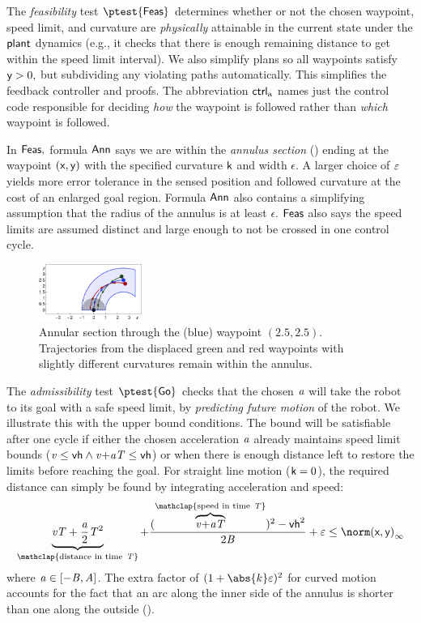 \documentclass[12pt]{cmuthesis}
\theoremstyle{definition}
\theoremstyle{remark}
\newcommand{\rref}[2][]{\prettyref{#2}}
\begin{document}
The \emph{feasibility} test $\ptest{\planreq}$ determines whether or not the chosen waypoint, speed limit, and curvature are \emph{physically} attainable in the current state under the $\textsf{plant}$ dynamics (e.g., it checks that there is enough remaining distance to get within the speed limit interval).
We also simplify plans so all waypoints satisfy $\textsf{y} > 0,$ but subdividing any violating paths automatically.
This simplifies the feedback controller and proofs.
The abbreviation $\textsf{ctrl}_{\text{a}}$ names just the control code responsible for deciding \emph{how} the waypoint is followed rather than \emph{which} waypoint is followed.


In $\textsf{Feas},$ formula $\textsf{Ann}$ says we are within the \emph{annulus section} (\rref{fig:circlestaging}) ending at the waypoint $(\textsf{x}, \textsf{y})$ with the specified curvature $\textsf{k}$ and width $\epsilon$.
A larger choice of $\varepsilon$ yields more error tolerance in the sensed position and followed curvature at the cost of an enlarged goal region.
Formula $\textsf{Ann}$ also contains a simplifying assumption that the radius of the annulus is at least $\epsilon$.
$\textsf{Feas}$ also says the speed limits are assumed distinct and large enough to not be crossed in one control cycle.

\begin{figure}[h!]
\centering
\includegraphics[width=0.3\textwidth]{graphics/fig-ode3.pdf}
\caption{Annular section through the (blue) waypoint $(2.5,2.5)$. Trajectories from the displaced green and red waypoints with slightly different curvatures remain within the annulus.}\label{fig:circlestaging}
\label{fig:circlestaging}
\end{figure}

The \emph{admissibility} test $\ptest{\admiss}$ checks that the chosen ${\it a}$ will take the robot to its goal with a safe speed limit, by \emph{predicting future motion} of the robot.
We illustrate this with the upper bound conditions.
The bound will be satisfiable after one cycle if either the chosen acceleration ${\it a}$ already maintains speed limit bounds (${\it v} \leq \textsf{vh} \land {\it v}{+}{\it a}{\it T} \leq \textsf{vh}$) or when there is enough distance left to restore the limits before reaching the goal.
For straight line motion ($\textsf{k}=0$), the required distance can simply be found by integrating acceleration and speed:
\begin{equation*}
\underbrace{\vvar\Tvar+\frac{\avar}{2}\Tvar^2}_{\mathclap{\text{distance in time}~\Tvar}} + \frac{(\overbrace{\vvar{+}\avar\Tvar}^{\mathclap{\text{speed in time}~\Tvar}})^2-\vhvar^2}{2\Bvar} + \veps \leq \lnorm{(\xgvar,\ygvar)}
\end{equation*}
where ${\it a} \in [-{\it B},{\it A}]$.
The extra factor of $(1 + \abs{k}\veps)^2$ for curved motion accounts for the fact that an arc along the inner side of the annulus is shorter than one along the outside (\rref{fig:circlestaging}).
\end{document}
